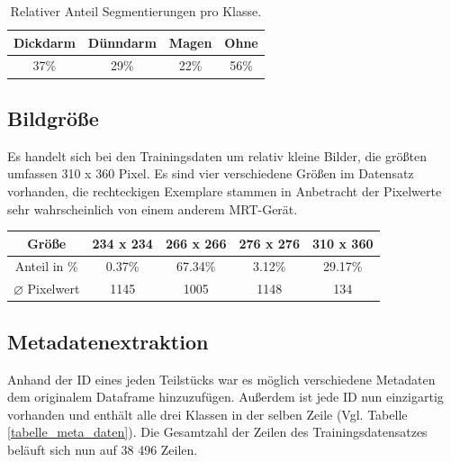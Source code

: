 \begin{table}[!ht]
    \centering
    \begin{tabular}{|c|c|c|c|}
    \hline
        Dickdarm & Dünndarm & Magen & Ohne \\ \hline
        37\% & 29\% & 22\% & 56\% \\ \hline
    \end{tabular}
    \caption{Relativer Anteil Segmentierungen pro Klasse.}
    \label{Tab:klassenverteilung}
\end{table}

\subsection{Bildgröße} \label{ssec:input-size}

Es handelt sich bei den Trainingsdaten um relativ kleine Bilder, die größten umfassen 310 {x} 360 Pixel. Es sind vier verschiedene Größen im Datensatz vorhanden, die rechteckigen Exemplare stammen in Anbetracht der Pixelwerte sehr wahrscheinlich von einem anderem MRT-Gerät.

\begin{table}[!ht]
    \centering
    \begin{tabular}{|c|c|c|c|c|}
    \hline
        Größe & 234 {x} 234 & 266 {x} 266 & 276 {x} 276 & 310 {x} 360 \\ \hline
        Anteil in \% & 0.37\% & 67.34\% & 3.12\% & 29.17\% \\ \hline
        $\varnothing $ Pixelwert & 1145 & 1005 & 1148 & 134 \\\hline
    \end{tabular}
    \label{Tab:klassenverteilung}
\end{table}



\subsection{Metadatenextraktion}

Anhand der ID eines jeden Teilstücks war es möglich verschiedene Metadaten dem originalem Dataframe hinzuzufügen. Außerdem ist jede ID nun einzigartig vorhanden und enthält alle drei Klassen in der selben Zeile (Vgl. Tabelle \ref{tabelle_meta_daten}). Die Gesamtzahl der Zeilen des Trainingsdatensatzes beläuft sich nun auf 38 496 Zeilen. 

